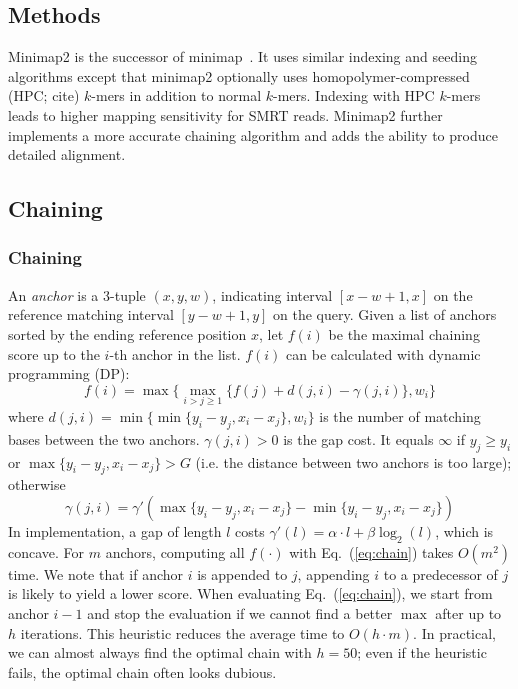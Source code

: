 \documentclass{bioinfo}
\begin{document}
\begin{methods}
\section{Methods}

Minimap2 is the successor of minimap~\citep{Li:2016aa}. It uses similar
indexing and seeding algorithms except that minimap2 optionally uses
homopolymer-compressed (HPC; cite) $k$-mers in addition to normal $k$-mers.
Indexing with HPC $k$-mers leads to higher mapping sensitivity for SMRT reads.
Minimap2 further implements a more accurate chaining algorithm and adds
the ability to produce detailed alignment.

\subsection{Chaining}

\subsubsection{Chaining}
An \emph{anchor} is a 3-tuple $(x,y,w)$, indicating interval $[x-w+1,x]$ on the
reference matching interval $[y-w+1,y]$ on the query. Given a list of anchors
sorted by the ending reference position $x$, let $f(i)$ be the maximal chaining
score up to the $i$-th anchor in the list. $f(i)$ can be calculated with
dynamic programming (DP):
\begin{equation}\label{eq:chain}
f(i)=\max\big\{\max_{i>j\ge 1} \{ f(j)+d(j,i)-\gamma(j,i) \},w_i\big\}
\end{equation}
where $d(j,i)=\min\big\{\min\{y_i-y_j,x_i-x_j\},w_i\big\}$ is the number of
matching bases between the two anchors. $\gamma(j,i)>0$ is the gap cost. It
equals $\infty$ if $y_j\ge y_i$ or $\max\{y_i-y_j,x_i-x_j\}>G$ (i.e. the
distance between two anchors is too large); otherwise
\[
\gamma(j,i)=\gamma'(\max\{y_i-y_j,x_i-x_j\}-\min\{y_i-y_j,x_i-x_j\})
\]
In implementation, a gap of length $l$ costs $\gamma'(l)=\alpha\cdot
l+\beta\log_2(l)$, which is concave. For $m$ anchors, computing all $f(\cdot)$
with Eq.~(\ref{eq:chain}) takes $O(m^2)$ time. We note that if anchor $i$ is
appended to $j$, appending $i$ to a predecessor of $j$ is likely to yield a
lower score. When evaluating Eq.~(\ref{eq:chain}), we start from anchor $i-1$
and stop the evaluation if we cannot find a better $\max$ after up to $h$
iterations. This heuristic reduces the average time to $O(h\cdot m)$. In
practical, we can almost always find the optimal chain with $h=50$; even if the
heuristic fails, the optimal chain often looks dubious.


\end{methods}
\end{document}

